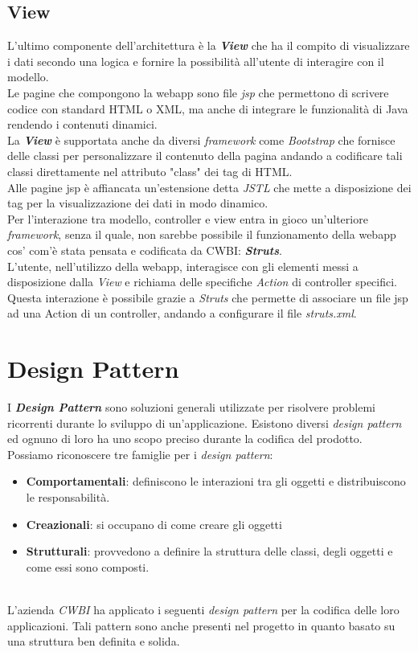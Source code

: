 \subsection*{View}
L'ultimo componente dell'architettura è la \textit{\textbf{View}} che ha il compito di visualizzare i dati secondo una logica e fornire la possibilità all'utente di interagire con il modello.
\\
\noindent
Le pagine che compongono la webapp sono file \textit{jsp} che permettono di scrivere codice con standard HTML o XML, ma anche di integrare le funzionalità di Java rendendo i contenuti dinamici. \\
\newpage
\noindent
La \textbf{\textit{View}} è supportata anche da diversi \textit{framework} come \textit{Bootstrap} che fornisce delle classi per personalizzare il contenuto della pagina andando a codificare tali classi direttamente nel attributo "class" dei tag di HTML. \\
Alle pagine jsp è affiancata un'estensione detta \textit{JSTL} che mette a disposizione dei tag per la visualizzazione dei dati in modo dinamico.
\\
\noindent
Per l'interazione tra modello, controller e view entra in gioco un'ulteriore \textit{framework}, senza il quale, non sarebbe possibile il funzionamento della webapp cos' com'è stata pensata e codificata da CWBI: \textit{\textbf{Struts}}.\\

\noindent
L'utente, nell'utilizzo della webapp, interagisce con gli elementi messi a disposizione dalla \textit{View} e richiama delle specifiche \textit{Action} di controller specifici. Questa interazione è possibile grazie a \textit{Struts} che permette di associare un file jsp ad una Action di un controller, andando a configurare il file \textit{struts.xml}.

\section{Design Pattern}
I \textbf{\textit{Design Pattern}} sono soluzioni generali utilizzate per risolvere problemi ricorrenti durante lo sviluppo di un'applicazione. Esistono diversi \textit{design pattern} ed ognuno di loro ha uno scopo preciso durante la codifica del prodotto. \\
Possiamo riconoscere tre famiglie per i \textit{design pattern}:\\
\begin{itemize}
\item \textbf{Comportamentali}: definiscono le interazioni tra gli oggetti e distribuiscono le responsabilità.
\item \textbf{Creazionali}: si occupano di come creare gli oggetti
\item \textbf{Strutturali}: provvedono a definire la struttura delle classi, degli oggetti e come essi sono composti.
\end{itemize} 
\\
\noindent
L'azienda \textit{CWBI} ha applicato i seguenti \textit{design pattern} per la codifica delle loro applicazioni. Tali pattern sono anche presenti nel progetto in quanto basato su una struttura ben definita e solida.

